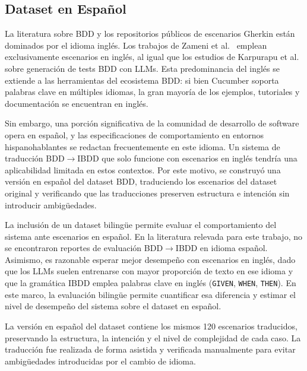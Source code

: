 \subsection{Dataset en Español}

La literatura sobre BDD y los repositorios públicos de escenarios Gherkin están dominados por el idioma inglés. Los trabajos de Zameni et al.~\cite{zameni2024ibdd, zameni2023bddts, zameni2025composition} emplean exclusivamente escenarios en inglés, al igual que los estudios de Karpurapu et al.~\cite{karpurapu2024llm} sobre generación de tests BDD con LLMs. Esta predominancia del inglés se extiende a las herramientas del ecosistema BDD: si bien Cucumber soporta palabras clave en múltiples idiomas, la gran mayoría de los ejemplos, tutoriales y documentación se encuentran en inglés.

Sin embargo, una porción significativa de la comunidad de desarrollo de software opera en español, y las especificaciones de comportamiento en entornos hispanohablantes se redactan frecuentemente en este idioma. Un sistema de traducción BDD$\rightarrow$IBDD que solo funcione con escenarios en inglés tendría una aplicabilidad limitada en estos contextos. Por este motivo, se construyó una versión en español del dataset BDD, traduciendo los escenarios del dataset original y verificando que las traducciones preserven estructura e intención sin introducir ambigüedades.

La inclusión de un dataset bilingüe permite evaluar el comportamiento del sistema ante escenarios en español. En la literatura relevada para este trabajo, no se encontraron reportes de evaluación BDD$\rightarrow$IBDD en idioma español. Asimismo, es razonable esperar mejor desempeño con escenarios en inglés, dado que los LLMs suelen entrenarse con mayor proporción de texto en ese idioma y que la gramática IBDD emplea palabras clave en inglés (\texttt{GIVEN}, \texttt{WHEN}, \texttt{THEN}). En este marco, la evaluación bilingüe permite cuantificar esa diferencia y estimar el nivel de desempeño del sistema sobre el dataset en español.

La versión en español del dataset contiene los mismos 120 escenarios traducidos, preservando la estructura, la intención y el nivel de complejidad de cada caso. La traducción fue realizada de forma asistida y verificada manualmente para evitar ambigüedades introducidas por el cambio de idioma.
